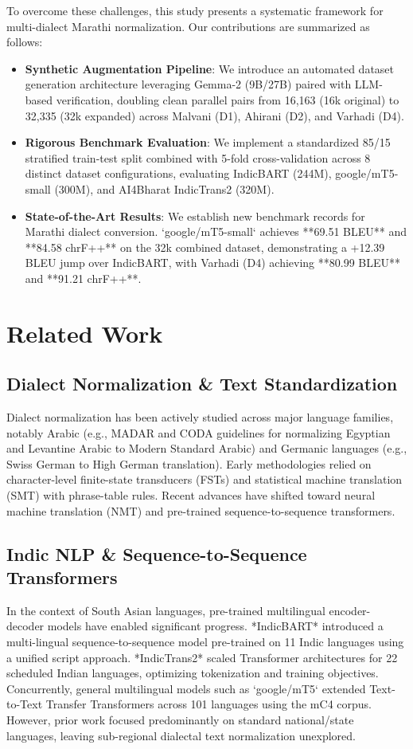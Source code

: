 \documentclass[journal,twocolumn]{IEEEtran}
\begin{document}
To overcome these challenges, this study presents a systematic framework for multi-dialect Marathi normalization. Our contributions are summarized as follows:
\begin{itemize}
    \item \textbf{Synthetic Augmentation Pipeline}: We introduce an automated dataset generation architecture leveraging Gemma-2 (9B/27B) paired with LLM-based verification, doubling clean parallel pairs from 16,163 (16k original) to 32,335 (32k expanded) across Malvani (D1), Ahirani (D2), and Varhadi (D4).
    \item \textbf{Rigorous Benchmark Evaluation}: We implement a standardized 85/15 stratified train-test split combined with 5-fold cross-validation across 8 distinct dataset configurations, evaluating IndicBART (244M), google/mT5-small (300M), and AI4Bharat IndicTrans2 (320M).
    \item \textbf{State-of-the-Art Results}: We establish new benchmark records for Marathi dialect conversion. `google/mT5-small` achieves **69.51 BLEU** and **84.58 chrF++** on the 32k combined dataset, demonstrating a +12.39 BLEU jump over IndicBART, with Varhadi (D4) achieving **80.99 BLEU** and **91.21 chrF++**.
\end{itemize}

\section{Related Work}
\subsection{Dialect Normalization & Text Standardization}
Dialect normalization has been actively studied across major language families, notably Arabic (e.g., MADAR and CODA guidelines for normalizing Egyptian and Levantine Arabic to Modern Standard Arabic) and Germanic languages (e.g., Swiss German to High German translation). Early methodologies relied on character-level finite-state transducers (FSTs) and statistical machine translation (SMT) with phrase-table rules. Recent advances have shifted toward neural machine translation (NMT) and pre-trained sequence-to-sequence transformers.

\subsection{Indic NLP & Sequence-to-Sequence Transformers}
In the context of South Asian languages, pre-trained multilingual encoder-decoder models have enabled significant progress. *IndicBART* \cite{indicbart} introduced a multi-lingual sequence-to-sequence model pre-trained on 11 Indic languages using a unified script approach. *IndicTrans2* \cite{indictrans2} scaled Transformer architectures for 22 scheduled Indian languages, optimizing tokenization and training objectives. Concurrently, general multilingual models such as `google/mT5` \cite{mt5} extended Text-to-Text Transfer Transformers across 101 languages using the mC4 corpus. However, prior work focused predominantly on standard national/state languages, leaving sub-regional dialectal text normalization unexplored.
\end{document}
